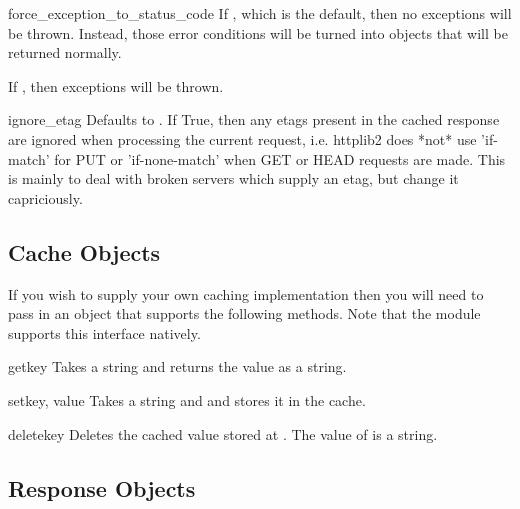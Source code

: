 \begin{memberdesc}[Http]{force_exception_to_status_code}
If , which is the default, then no  exceptions will be thrown. Instead,
those error conditions will be turned into  objects
that will be returned normally.

If , then exceptions will be thrown.
\end{memberdesc}

\begin{memberdesc}[Http]{ignore_etag}
Defaults to . If True, then any etags present in the cached response
are ignored when processing the current request, i.e. httplib2 does *not* use
'if-match' for PUT or 'if-none-match' when GET or HEAD requests are made. This
is mainly to deal with broken servers which supply an etag, but change it capriciously.
\end{memberdesc}

\subsection{Cache Objects}
\label{cache-objects}

If you wish to supply your own caching implementation
then you will need to pass in an object that supports the 
following methods. Note that the  module
supports this interface natively.

\begin{methoddesc}[Cache]{get}{key}
Takes a string  and returns the value as a string.
\end{methoddesc}

\begin{methoddesc}[Cache]{set}{key, value}
Takes a string  and  and stores it in the cache.
\end{methoddesc}

\begin{methoddesc}[Cache]{delete}{key}
Deletes the cached value stored at . The value
of  is a string.
\end{methoddesc}





\subsection{Response Objects}
\label{response-objects}

